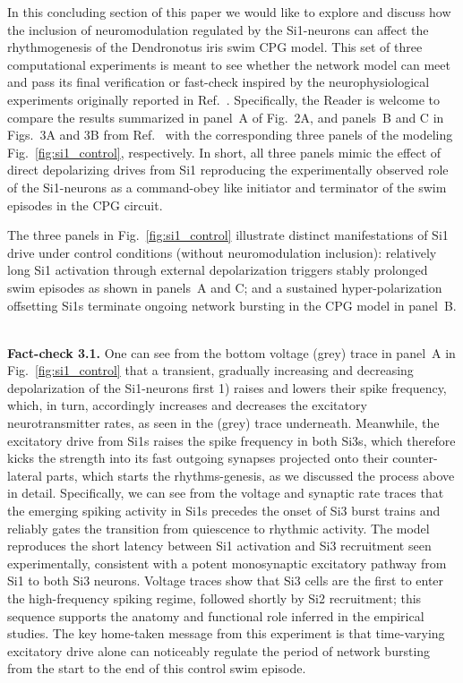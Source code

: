 \documentclass[nofootinbib,aip,amsmath,amssymb,reprint,twocolumn,10pt]{revtex4-2}
\begin{document}
In this concluding section of this paper we would like to explore and discuss how the inclusion of 
neuromodulation regulated by the Si1-neurons can affect the rhythmogenesis of the {Dendronotus iris} 
swim CPG model. This set of three computational experiments is meant to see whether the network model can meet and pass its final verification or fast-check inspired by the neurophysiological experiments originally reported in Ref.~\cite{sakurai2019command}. Specifically, the Reader is welcome to compare the results summarized in panel~A of Fig.~2A, and panels~B and C in Figs.~3A and 3B from Ref.~\cite{sakurai2019command} with the  corresponding three panels of the modeling Fig.~\ref{fig:si1_control}, respectively.  In short, all three panels mimic the effect of direct depolarizing drives from Si1 reproducing the experimentally observed role of the Si1-neurons as a command-obey like initiator and terminator of the swim episodes in the CPG circuit. 

The three panels in Fig.~\ref{fig:si1_control} illustrate distinct manifestations of Si1 drive under control conditions (without neuromodulation inclusion): relatively long Si1 activation through external depolarization  triggers stably prolonged swim episodes  as shown in panels~A and C; and a sustained hyper-polarization offsetting Si1s terminate ongoing network bursting in the CPG model in panel~B.

~\\
{\bf Fact-check 3.1.} One can see from the bottom voltage (grey) trace in panel~A in Fig.~\ref{fig:si1_control} that a transient, gradually increasing and decreasing depolarization of the Si1-neurons first 1) raises and lowers their spike frequency, which, in turn, accordingly increases and decreases the excitatory neurotransmitter rates, as seen in the (grey) trace underneath. Meanwhile, the excitatory drive from Si1s raises the spike frequency in both Si3s, which therefore kicks the strength into  its fast outgoing synapses projected onto their counter-lateral parts, which starts the rhythms-genesis, as we discussed the process above in detail. Specifically, we can see from the voltage and synaptic rate traces that the emerging spiking activity in Si1s precedes the onset of Si3 burst trains and reliably gates the transition from quiescence to rhythmic activity. The model reproduces the short latency between Si1 activation and Si3 recruitment seen experimentally, consistent with a potent monosynaptic excitatory pathway from Si1 to both Si3 neurons. Voltage traces show that Si3 cells are the first to enter the high-frequency spiking regime, followed shortly by Si2 recruitment; this sequence supports the anatomy and functional role inferred in the empirical studies. The key home-taken message from this experiment is that time-varying excitatory drive alone can noticeably regulate the period of network bursting from the start to the end of this control swim episode.
\end{document}
